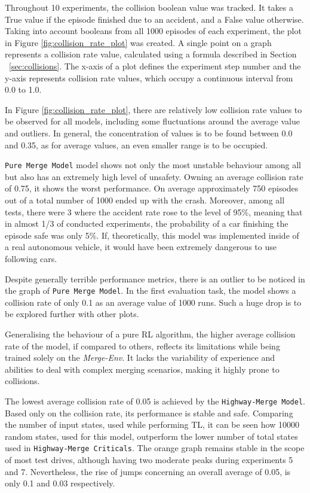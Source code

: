 Throughout 10 experiments, the collision boolean value was tracked. It takes a True value if the episode finished due to an accident, and a False value otherwise. Taking into account booleans from all 1000 episodes of each experiment, the plot in Figure \ref{fig:collision_rate_plot} was created. A single point on a graph represents a collision rate value, calculated using a formula described in Section ~\ref{sec:collisions}. The x-axis of a plot defines the experiment step number and the y-axis represents collision rate values, which occupy a continuous interval from 0.0 to 1.0.

In Figure \ref{fig:collision_rate_plot}, there are relatively low collision rate values to be observed for all models, including some fluctuations around the average value and outliers. In general, the concentration of values is to be found between 0.0 and 0.35, as for average values, an even smaller range is to be occupied. 

\texttt{Pure Merge Model} model shows not only the most unstable behaviour among all but also has an extremely high level of unsafety. Owning an average collision rate of 0.75, it shows the worst performance. On average approximately 750 episodes out of a total number of 1000 ended up with the crash. Moreover, among all tests, there were 3 where the accident rate rose to the level of 95\%, meaning that in almost 1/3 of conducted experiments, the probability of a car finishing the episode safe was only 5\%. If, theoretically, this model was implemented inside of a real autonomous vehicle, it would have been extremely dangerous to use following cars.

Despite generally terrible performance metrics, there is an outlier to be noticed in the graph of \texttt{Pure Merge Model}. In the first evaluation task, the model shows a collision rate of only 0.1 as an average value of 1000 runs. Such a huge drop is to be explored further with other plots.

Generalising the behaviour of a pure   RL algorithm, the higher average collision rate of the model, if compared to others, reflects its limitations while being trained solely on the \emph{Merge-Env}. It lacks the variability of experience and abilities to deal with complex merging scenarios, making it highly prone to collisions. 

The lowest average collision rate of 0.05 is achieved by the \texttt{Highway-Merge Model}. Based only on the collision rate, its performance is stable and safe. Comparing the number of input states, used while performing TL, it can be seen how 10000 random states, used for this model, outperform the lower number of total states used in \texttt{Highway-Merge Criticals}. The orange graph remains stable in the scope of most test drives, although having two moderate peaks during experiments 5 and 7. Nevertheless, the rise of jumps concerning an overall average of 0.05, is only 0.1 and 0.03 respectively.

